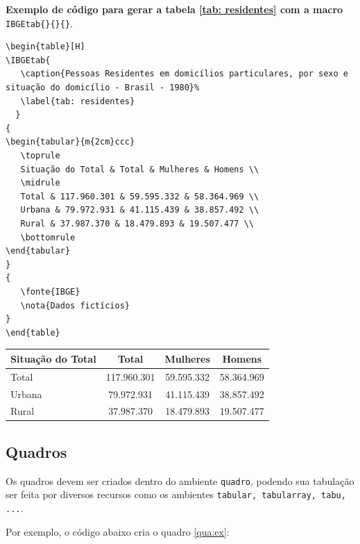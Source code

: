 \pagebreak
\textbf{Exemplo de código para gerar a tabela \ref{tab: residentes} com a macro} \verb|IBGEtab{}{}{}|.

\begin{verbatim}
\begin{table}[H]
\IBGEtab{
   \caption{Pessoas Residentes em domicílios particulares, por sexo e situação do domicílio - Brasil - 1980}%
   \label{tab: residentes}
  }
{
\begin{tabular}{m{2cm}ccc}
   \toprule
   Situação do Total & Total & Mulheres & Homens \\
   \midrule
   Total & 117.960.301 & 59.595.332 & 58.364.969 \\
   Urbana & 79.972.931 & 41.115.439 & 38.857.492 \\
   Rural & 37.987.370 & 18.479.893 & 19.507.477 \\
   \bottomrule
\end{tabular}
}
{
   \fonte{IBGE}
   \nota{Dados fictícios}
}
\end{table}
\end{verbatim}

\begin{table}[H]
{
\begin{tabular}{m{2.0cm}ccc}
 \toprule
 Situação do Total & Total & Mulheres & Homens \\
\midrule
Total & 117.960.301 & 59.595.332 & 58.364.969 \\
Urbana & 79.972.931 & 41.115.439 & 38.857.492 \\
Rural & 37.987.370 & 18.479.893 & 19.507.477 \\
\bottomrule
\end{tabular}
}
{
}
\end{table}



\subsection{Quadros}

Os quadros devem ser criados dentro do ambiente \verb|quadro|, podendo sua tabulação ser feita por diversos recursos como os ambientes \verb|tabular, tabularray, tabu, ...|.

Por exemplo, o código abaixo cria o quadro \ref{qua:ex}:

